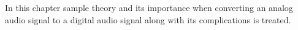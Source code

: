 In this chapter sample theory and its importance when converting an analog audio signal to a digital audio signal along with its complications is treated.

